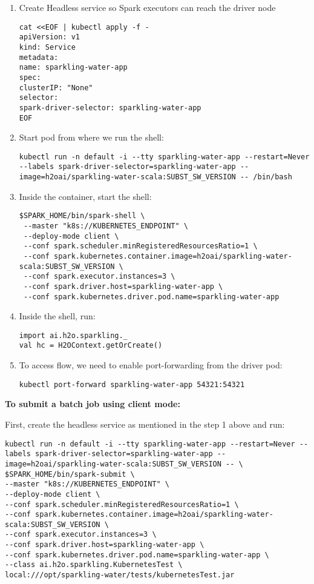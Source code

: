 \begin{enumerate}
    \item Create Headless service so Spark executors can reach the driver node
    \begin{lstlisting}[style=Bash]
cat <<EOF | kubectl apply -f -
apiVersion: v1
kind: Service
metadata:
name: sparkling-water-app
spec:
clusterIP: "None"
selector:
spark-driver-selector: sparkling-water-app
EOF
    \end{lstlisting}
    \item Start pod from where we run the shell:
    \begin{lstlisting}[style=Bash]
kubectl run -n default -i --tty sparkling-water-app --restart=Never --labels spark-driver-selector=sparkling-water-app --image=h2oai/sparkling-water-scala:SUBST_SW_VERSION -- /bin/bash
    \end{lstlisting}
    \item Inside the container, start the shell:
    \begin{lstlisting}[style=Bash]
$SPARK_HOME/bin/spark-shell \
 --master "k8s://KUBERNETES_ENDPOINT" \
 --deploy-mode client \
 --conf spark.scheduler.minRegisteredResourcesRatio=1 \
 --conf spark.kubernetes.container.image=h2oai/sparkling-water-scala:SUBST_SW_VERSION \
 --conf spark.executor.instances=3 \
 --conf spark.driver.host=sparkling-water-app \
 --conf spark.kubernetes.driver.pod.name=sparkling-water-app
    \end{lstlisting}
    \item Inside the shell, run:
    \begin{lstlisting}[style=Scala]
import ai.h2o.sparkling._
val hc = H2OContext.getOrCreate()
    \end{lstlisting}
    \item To access flow, we need to enable port-forwarding from the driver pod:
    \begin{lstlisting}[style=Bash]
kubectl port-forward sparkling-water-app 54321:54321
    \end{lstlisting}
\end{enumerate}


\textbf{To submit a batch job using client mode:}

First, create the headless service as mentioned in the step 1 above and run:

\begin{lstlisting}[style=Bash]
kubectl run -n default -i --tty sparkling-water-app --restart=Never --labels spark-driver-selector=sparkling-water-app --image=h2oai/sparkling-water-scala:SUBST_SW_VERSION -- \
$SPARK_HOME/bin/spark-submit \
--master "k8s://KUBERNETES_ENDPOINT" \
--deploy-mode client \
--conf spark.scheduler.minRegisteredResourcesRatio=1 \
--conf spark.kubernetes.container.image=h2oai/sparkling-water-scala:SUBST_SW_VERSION \
--conf spark.executor.instances=3 \
--conf spark.driver.host=sparkling-water-app \
--conf spark.kubernetes.driver.pod.name=sparkling-water-app \
--class ai.h2o.sparkling.KubernetesTest \
local:///opt/sparkling-water/tests/kubernetesTest.jar
\end{lstlisting}

